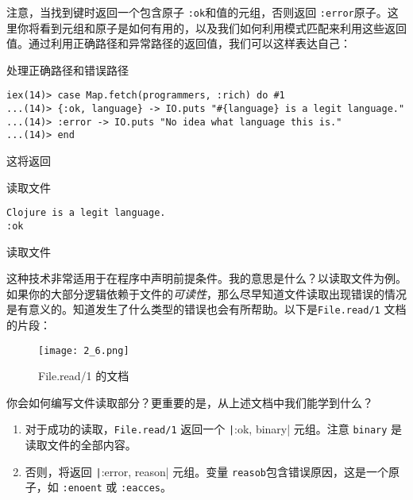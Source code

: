 注意，当找到键时返回一个包含原子 \texttt{:ok}和值的元组，否则返回 \texttt{:error}原子。这里你将看到元组和原子是如何有用的，以及我们如何利用模式匹配来利用这些返回值。通过利用正确路径和异常路径的返回值，我们可以这样表达自己：

\begin{code}{处理正确路径和错误路径}
\begin{verbatim}
iex(14)> case Map.fetch(programmers, :rich) do #1
...(14)> {:ok, language} -> IO.puts "#{language} is a legit language."
...(14)> :error -> IO.puts "No idea what language this is."
...(14)> end
\end{verbatim}
\label{lst:handling_the_happy_path_and_the_error_path}
\end{code}

这将返回

\begin{code}{读取文件}
\begin{verbatim}
Clojure is a legit language.
:ok
\end{verbatim}
\end{code}


\begin{example}{读取文件}
\end{example}

这种技术非常适用于在程序中声明前提条件。我的意思是什么？以读取文件为例。如果你的大部分逻辑依赖于文件的\emph{可读性}，那么尽早知道文件读取出现错误的情况是有意义的。知道发生了什么类型的错误也会有所帮助。以下是\texttt{File.read/1} 文档的片段：

\begin{figure}[!ht]
    \centering
    \texttt{[image: 2\_6.png]}
    \caption{File.read/1 的文档}
    \label{fig:2_6}
\end{figure}

你会如何编写文件读取部分？更重要的是，从上述文档中我们能学到什么？

\begin{enumerate}
\def\labelenumi{\arabic{enumi}.}

\item
  对于成功的读取，\texttt{File.read/1} 返回一个
  \texttt|{:ok, binary}| 元组。注意
  \texttt{binary} 是读取文件的全部内容。
\item
  否则，将返回 \texttt|{:error, reason}| 元组。变量
  \texttt{reasob}包含错误原因，这是一个原子，如
  \texttt{:enoent} 或
  \texttt{:eacces}。
\end{enumerate}


